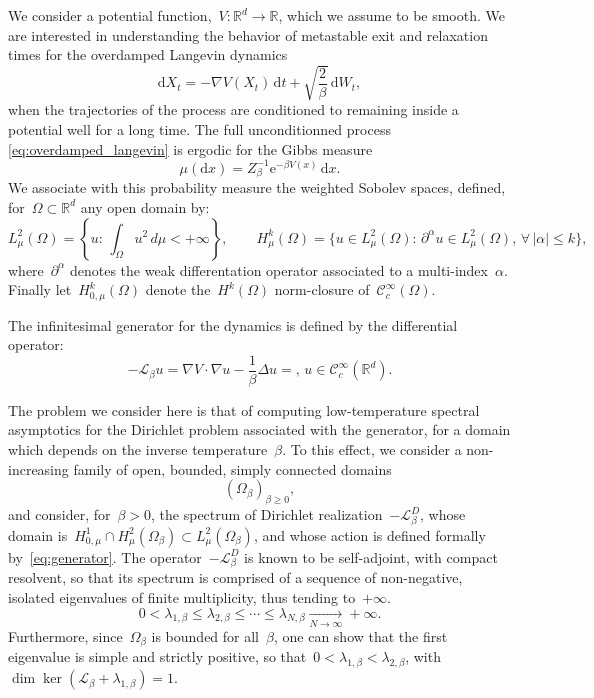 \documentclass[10pt]{article}
\newcommand{\cL}{\mathcal{L}}
\renewcommand{\d}{\mathrm{d}}
\newcommand{\e}{\mathrm{e}}
\newcommand{\R}{\mathbb{R}}
\newcommand{\1}{\mathbbm 1}
\begin{document}
    We consider a potential function,~$V : \R^d \to \R$, which we assume to be smooth.
    We are interested in understanding the behavior of metastable exit and relaxation times for the overdamped Langevin dynamics
    \begin{equation}
        \label{eq:overdamped_langevin}
        \d X_t = -\nabla V(X_t)\,\d t + \sqrt{\frac2\beta}\, \d W_t,
    \end{equation}
    when the trajectories of the process are conditioned to remaining inside a potential well for a long time.
    The full unconditionned process \eqref{eq:overdamped_langevin} is ergodic for the Gibbs measure
    \[\mu(\d x) = Z_\beta^{-1}\e^{-\beta V(x)}\,\d x.\]
    We associate with this probability measure the weighted Sobolev spaces, defined, for~$\Omega\subset \R^d$ any open domain by:
    \begin{equation}
        \label{eq:sobolev_spaces}
        L_\mu^2(\Omega) = \left\{u:\,\int_{\Omega} u^2 \,d\mu < +\infty\right\},\qquad H^{k}_\mu(\Omega) = \{u\in L^2_\mu(\Omega):\,\partial^{\alpha}u\in L^2_\mu(\Omega),\,\forall\, |\alpha|\leq k\},
    \end{equation}
    where~$\partial^\alpha$ denotes the weak differentation operator associated to a multi-index~$\alpha$. Finally let~$H_{0,\mu}^k(\Omega)$ denote the~$H^k(\Omega)$ norm-closure of~$\mathcal C^\infty_c(\Omega)$.

    The infinitesimal generator for the dynamics is defined by the differential operator:
    \begin{equation}
        \label{eq:generator}
        -\cL_\beta u = \nabla V \cdot \nabla u - \frac1\beta \Delta u=,\, u \in \mathcal C^\infty_c(\R^d).
    \end{equation}

    The problem we consider here is that of computing low-temperature spectral asymptotics for the Dirichlet problem associated with the generator, for a domain which depends on the inverse temperature~$\beta$.
    To this effect, we consider a non-increasing family of open, bounded, simply connected domains
    \[(\Omega_\beta)_{\beta \geq 0},\]
    and consider, for~$\beta>0$, the spectrum of Dirichlet realization~$-\cL_\beta^D$, whose domain is~$H_{0,\mu}^1\cap H^2_{\mu}(\Omega_\beta) \subset L^2_\mu(\Omega_\beta)$,
    and whose action is defined formally by~\eqref{eq:generator}.
    The operator~$-\cL_\beta^D$ is known to be self-adjoint, with compact resolvent, so that its spectrum is comprised of a sequence of non-negative, isolated eigenvalues of finite multiplicity, thus tending to~$+\infty$.
   ~$$0<\lambda_{1,\beta} \leq \lambda_{2,\beta}\leq \dotsm \leq\lambda_{N,\beta} \underset{N\to\infty}{\longrightarrow}+\infty.$$
    Furthermore, since~$\Omega_\beta$ is bounded for all~$\beta$, one can show that the first eigenvalue is simple and strictly positive, so that~$0<\lambda_{1,\beta} < \lambda_{2,\beta}$, with~$\dim \ker \left(\cL_\beta+\lambda_{1,\beta}\right)=1$.
\end{document}
